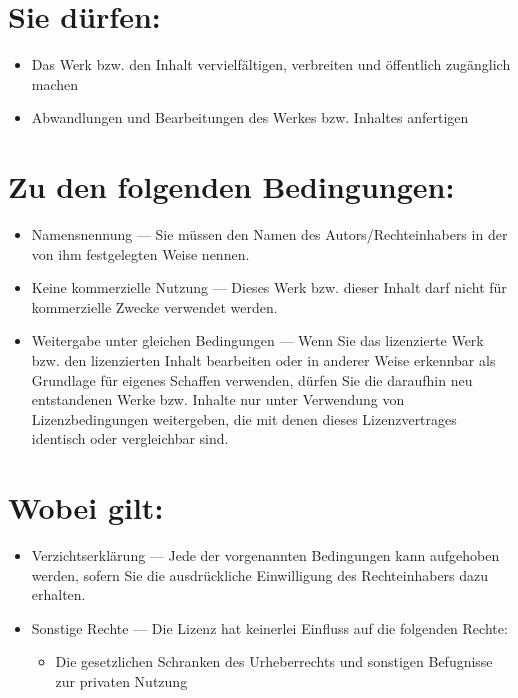 \begin{small}

\section*{Sie dürfen:}
\begin{itemize}
\item
Das Werk bzw. den Inhalt vervielfältigen, verbreiten und öffentlich zugänglich machen
\item Abwandlungen und Bearbeitungen des Werkes bzw. Inhaltes anfertigen
\end{itemize}

\section*{Zu den folgenden Bedingungen:}
\begin{itemize}

\item Namensnennung —  Sie müssen den Namen des Autors/Rechteinhabers in der
von ihm festgelegten Weise nennen.

\item Keine kommerzielle Nutzung —  Dieses Werk bzw. dieser Inhalt darf nicht 
für kommerzielle Zwecke verwendet werden.

\item Weitergabe unter gleichen Bedingungen — Wenn Sie das lizenzierte Werk
bzw. den lizenzierten Inhalt bearbeiten oder in anderer Weise erkennbar als 
Grundlage für eigenes Schaffen verwenden, dürfen Sie die daraufhin neu 
entstandenen Werke bzw. Inhalte nur unter Verwendung von Lizenzbedingungen 
weitergeben, die mit denen dieses Lizenzvertrages identisch oder vergleichbar
sind.

\end{itemize}

\section*{Wobei gilt:}
\begin{itemize}
\item Verzichtserklärung  — Jede der vorgenannten Bedingungen kann aufgehoben
werden, sofern Sie die ausdrückliche Einwilligung des Rechteinhabers dazu 
erhalten.

\item Sonstige Rechte — Die Lizenz hat keinerlei Einfluss auf die folgenden 
Rechte:
\begin{itemize}
\item Die gesetzlichen Schranken des Urheberrechts und sonstigen
Befugnisse zur privaten Nutzung


\end{itemize}
\end{itemize}
\end{small}
